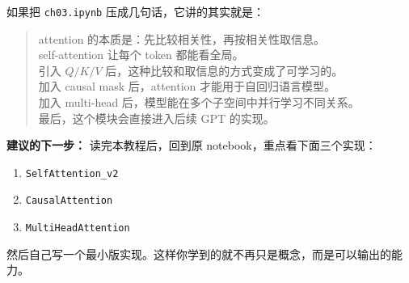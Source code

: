 \documentclass[12pt,a4paper]{ctexart}
\newcommand{\filepath}[1]{\texttt{#1}}
\newcommand{\code}[1]{\texttt{#1}}
\begin{document}
如果把 \filepath{ch03.ipynb} 压成几句话，它讲的其实就是：

\begin{quote}
attention 的本质是：先比较相关性，再按相关性取信息。\\
self-attention 让每个 token 都能看全局。\\
引入 \(Q/K/V\) 后，这种比较和取信息的方式变成了可学习的。\\
加入 causal mask 后，attention 才能用于自回归语言模型。\\
加入 multi-head 后，模型能在多个子空间中并行学习不同关系。\\
最后，这个模块会直接进入后续 GPT 的实现。
\end{quote}

\bigskip
\noindent
\textbf{建议的下一步：}
读完本教程后，回到原 notebook，重点看下面三个实现：

\begin{enumerate}
  \item \code{SelfAttention\_v2}
  \item \code{CausalAttention}
  \item \code{MultiHeadAttention}
\end{enumerate}

然后自己写一个最小版实现。这样你学到的就不再只是概念，而是可以输出的能力。
\end{document}
